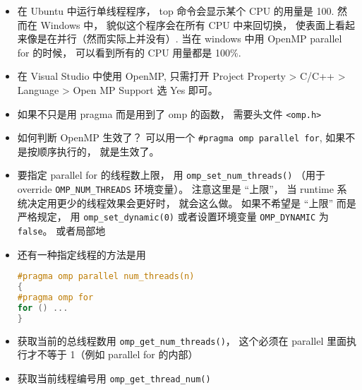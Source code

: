 
\begin{issues}
\issueDraft
\end{issues}


\begin{itemize}
\item 在 Ubuntu 中运行单线程程序， top 命令会显示某个 CPU 的用量是 100. 然而在 Windows 中， 貌似这个程序会在所有 CPU 中来回切换， 使表面上看起来像是在并行（然而实际上并没有）. 当在 windows 中用 OpenMP parallel for 的时候， 可以看到所有的 CPU 用量都是 100\%.
\item 在 Visual Studio 中使用 OpenMP, 只需打开 Project Property > C/C++ > Language > Open MP Support 选 Yes 即可。
\item 如果不只是用 pragma 而是用到了 omp 的函数， 需要头文件 \verb`<omp.h>`
\item 如何判断 OpenMP 生效了？ 可以用一个 \verb|#pragma omp parallel for|, 如果不是按顺序执行的， 就是生效了。

\item 要指定 parallel for 的线程数上限， 用 \verb`omp_set_num_threads()` （用于 override \verb`OMP_NUM_THREADS` 环境变量）。 注意这里是 “上限”， 当 runtime 系统决定用更少的线程效果会更好时， 就会这么做。 如果不希望是 “上限” 而是严格规定， 用 \verb`omp_set_dynamic(0)` 或者设置环境变量 \verb`OMP_DYNAMIC` 为 \verb`false`。
 或者局部地
\item 还有一种指定线程的方法是用
\begin{lstlisting}[language=cpp]
#pragma omp parallel num_threads(n)
{
#pragma omp for
for () ...
}
\end{lstlisting}
\item 获取当前的总线程数用 \verb`omp_get_num_threads()`， 这个必须在 parallel 里面执行才不等于 1（例如 parallel for 的内部）
\item 获取当前线程编号用 \verb`omp_get_thread_num()`


\end{itemize}
